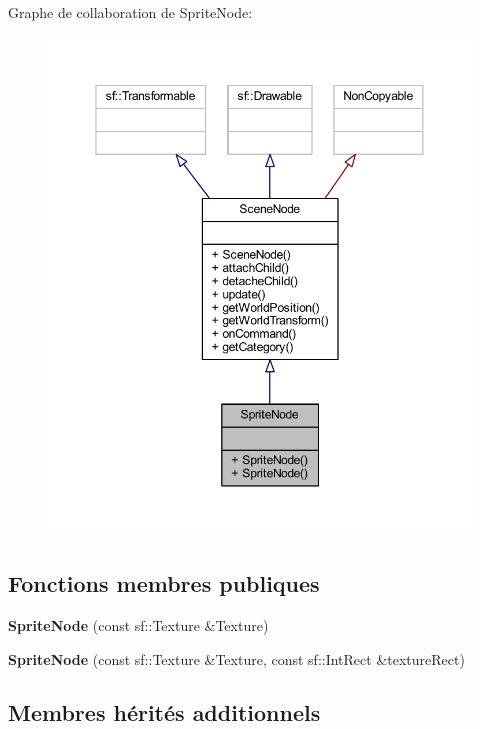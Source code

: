 Graphe de collaboration de Sprite\+Node\+:\nopagebreak
\begin{figure}[H]
\begin{center}
\leavevmode
\includegraphics[width=350pt]{class_sprite_node__coll__graph}
\end{center}
\end{figure}
\subsection*{Fonctions membres publiques}
\begin{DoxyCompactItemize}
\item 
{\bfseries Sprite\+Node} (const sf\+::\+Texture \&Texture)\hypertarget{class_sprite_node_a1e6e5c71881a9ec2ddf9d0640f15e6a6}{}\label{class_sprite_node_a1e6e5c71881a9ec2ddf9d0640f15e6a6}

\item 
{\bfseries Sprite\+Node} (const sf\+::\+Texture \&Texture, const sf\+::\+Int\+Rect \&texture\+Rect)\hypertarget{class_sprite_node_a6e047c482342a3dad1193097f0e1d125}{}\label{class_sprite_node_a6e047c482342a3dad1193097f0e1d125}

\end{DoxyCompactItemize}
\subsection*{Membres hérités additionnels}


